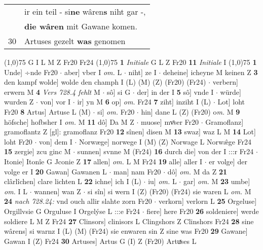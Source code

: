 \documentclass[8pt,a4paper,notitlepage]{article}
\begin{document}
\begin{table}[ht]
\begin{minipage}[t]{0.5\linewidth}
\begin{tabular}{rl}
 & ir ein teil - si\textbf{ne} wâren\textbf{s} niht gar -,\\ 
 & \textbf{die wâren} mit Gawane komen.\\ 
30 & Artuses gezelt \textbf{was} genomen\\ 
\end{tabular}
\scriptsize
\line(1,0){75} \newline
G I L M Z Fr20 Fr24 \newline
\line(1,0){75} \newline
\textbf{1} \textit{Initiale} G L Z Fr20  \textbf{11} \textit{Initiale} I  \newline
\line(1,0){75} \newline
\textbf{1} Unde] ÷nde Fr20  $\cdot$ aber] vber I \textit{om.} L  $\cdot$ niht] ze I  $\cdot$ deheine] icheyne M keinen Z \textbf{3} den kampf wolde] wolde den champh I (L) (M) (Z) (Fr20) (Fr24)  $\cdot$ verbern] erwern M \textbf{4} \textit{Vers 728.4 fehlt} M   $\cdot$ sô] si G  $\cdot$ der] in der I \textbf{5} sô] vnde I  $\cdot$ würde] wurden Z  $\cdot$ von] vor I  $\cdot$ ir] yn M \textbf{6} op] \textit{om.} Fr24 \textbf{7} ziht] inziht I (L)  $\cdot$ Lot] loht Fr20 \textbf{8} Artus] Artuse L (M)  $\cdot$ si] \textit{om.} Fr20  $\cdot$ hin] dane L (Z) (Fr20) o\textit{m. } M \textbf{9} höfsche] hofbsher I \textit{om.} M \textbf{11} dô] Da M Z  $\cdot$ muose] mvͦser Fr20  $\cdot$ Gramoflanz] gramoflantz Z [gl]: gramoflanz Fr20 \textbf{12} sînen] disen M \textbf{13} swaz] waz L M \textbf{14} Lot] loht Fr20  $\cdot$ von] dem I  $\cdot$ Norwæge] norwege I (M) (Z) Norwage L Norwæ̂ge Fr24 \textbf{15} zergie] zcu ginc M  $\cdot$ sunnen] svnne M (Fr24) \textbf{16} durch die] von der I :::r Fr24  $\cdot$ Itonie] Itonîe G Jconie Z \textbf{17} allen] \textit{om.} L M Fr24 \textbf{19} alle] aller I  $\cdot$ er volge] der volge er I \textbf{20} Gawan] Gawanen L  $\cdot$ man] nam Fr20  $\cdot$ dô] \textit{om.} M da Z \textbf{21} clârlîchen] clare lichten L \textbf{22} ichne] ich I (L)  $\cdot$ iu] \textit{om.} L  $\cdot$ gar] \textit{om.} M \textbf{23} umbe] \textit{om.} I L  $\cdot$ wannen] wan Z  $\cdot$ si sîn] si wern I (Z) (Fr20) (Fr24) sie waren L \textit{om.} M \textbf{24} \textit{nach 728.24:} vnd ouch allir slahte zorn Fr20   $\cdot$ verkorn] verlorn L \textbf{25} Orgeluse] Orgillvsie G Orguluse I Orgelýse L :::e Fr24  $\cdot$ fiere] here Fr20 \textbf{26} soldeniere] werde soldiere L M Z Fr24 \textbf{27} Clinsors] clinisors L Clingshors Z Clinshors Fr24 \textbf{28} sine wârens] si warnz I (L) (M) (Fr24) sie enwaren sin Z sine was Fr20 \textbf{29} Gawane] Gawan I (Z) Fr24 \textbf{30} Artuses] Artus G (I) Z (Fr20) Artuͯses L \newline

\end{minipage}
\end{table}
\end{document}
